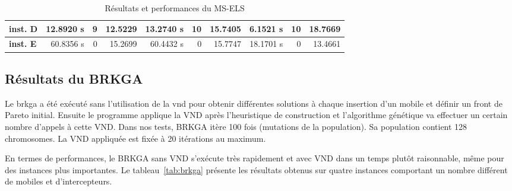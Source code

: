 \begin{table}[H]
\begin{tabular}{l|r|r|r|r|r|r|r|r|r|}
                \multicolumn{1}{|l|}{\textbf{inst. D}} & 12.8920 s                           & 9                                             & 12.5229                                         & 13.2740 s                           & 10                                            & 15.7405                                         & 6.1521 s                            & 10                                            & 18.7669                                         \\ \hline
                \multicolumn{1}{|l|}{\textbf{inst. E}} & 60.8356 s                           & 0                                             & 15.2699                                         & 60.4432 s                           & 0                                             & 15.7747                                         & 18.1701 s                           & 0                                             & 13.4661                                         \\ \hline
                \end{tabular}
                \caption{Résultats et performances du MS-ELS}
                \label{tab:msels}
            \end{table} 

        \subsection{Résultats du BRKGA}
			
			Le \acrlong{brkga} a été exécuté sans l'utilisation de la \acrshort{vnd} pour obtenir différentes solutions à chaque insertion d'un mobile et définir un front de Pareto initial. Ensuite le programme applique la VND après l'heuristique de construction et l'algorithme génétique va effectuer un certain nombre d'appels à cette VND. Dans nos tests, BRKGA itère 100 fois (mutations de la population). Sa population contient 128 chromosomes. La VND appliquée est fixée à 20 itérations au maximum.
			
			En termes de performances, le BRKGA sans VND s'exécute très rapidement et avec VND dans un temps plutôt raisonnable, même pour des instances plus importantes. Le tableau~\ref{tab:brkga} présente les résultats obtenus sur quatre instances comportant un nombre différent de mobiles et d'intercepteurs.
			
